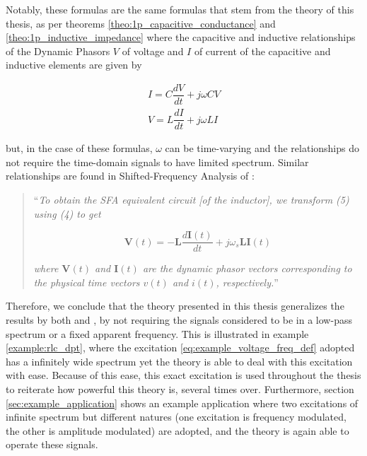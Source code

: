 	Notably, these formulas are the same formulas that stem from the theory of this thesis, as per theorems \ref{theo:1p_capacitive_conductance} and \ref{theo:1p_inductive_impedance} where the capacitive and inductive relationships of the Dynamic Phasors $V$ of voltage and $I$ of current of the capacitive and inductive elements are given by

\begin{gather}
	I = C\dfrac{dV}{dt} + j\omega C V \\[3mm]
	V = L\dfrac{dI}{dt} + j\omega L I
\end{gather}

	\noindent but, in the case of these formulas, $\omega$ can be time-varying and the relationships do not require the time-domain signals to have limited spectrum. Similar relationships are found in Shifted-Frequency Analysis of \cite{zhangSynchronousMachineModeling2007}:

\begin{quotation}
	``\textit{To obtain the SFA equivalent circuit [of the inductor], we transform (5) using (4) to get}

\begin{equation} \mathbf{V}(t) = -\mathbf{L}\dfrac{d\mathbf{I}(t)}{dt} + j\omega_s \mathbf{LI}(t)\end{equation}

	\noindent \textit{where $\mathbf{V}(t)$ and $\mathbf{I}(t)$ are the dynamic phasor vectors corresponding to the physical time vectors $v(t)$ and $i(t)$, respectively.}'' \hfill\cite{zhangSynchronousMachineModeling2007}
\end{quotation}

	Therefore, we conclude that the theory presented in this thesis generalizes the results by both \cite{Venkatasubramanian1994} and \cite{zhangSynchronousMachineModeling2007}, by not requiring the signals considered to be in a low-pass spectrum or a fixed apparent frequency. This is illustrated in example \ref{example:rlc_dpt}, where the excitation \eqref{eq:example_voltage_freq_def} adopted has a infinitely wide spectrum yet the theory is able to deal with this excitation with ease. Because of this ease, this exact excitation is used throughout the thesis to reiterate how powerful this theory is, several times over. Furthermore, section \ref{sec:example_application} shows an example application where two excitations of infinite spectrum but different natures (one excitation is frequency modulated, the other is amplitude modulated) are adopted, and the theory is again able to operate these signals.

